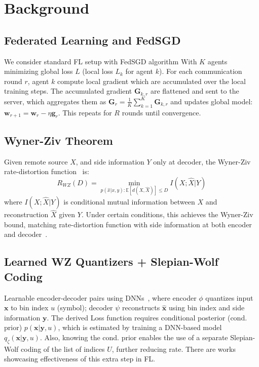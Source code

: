\section{Background}
\label{sec:background}

\subsection{Federated Learning and FedSGD}
\label{ssec:backFL}
We consider standard FL setup with FedSGD algorithm With $K$ agents minimizing global loss $L$ (local loss $L_k$ for agent $k$). For each communication round $r$, agent $k$ compute local gradient which are accumulated over the local training steps. The accumulated gradient $\mathbf{G}_{k,r}$  are flattened and sent to the server, which aggregates them as $\mathbf{G}_r = \frac{1}{K} \sum_{k=1}^{K} \mathbf{G}_{k,r}$ and updates global model: $\mathbf{w}_{r+1} = \mathbf{w}_r - \eta \mathbf{g}_r$. This repeats for $R$ rounds until convergence.

\subsection{Wyner-Ziv Theorem}
\label{ssec:backwz}
Given remote source $X$, and side information $Y$ only at decoder, the Wyner-Ziv rate-distortion function~\cite{WynerZiv1976} is:
\begin{equation}
    R_{WZ}(D) = \min_{p(\hat{x}|x,y): \mathbb{E}[d(X,\hat{X})] \leq D} I(X;\hat{X}|Y)
\end{equation}
where $I(X;\hat{X}|Y)$ is conditional mutual information between $X$ and reconstruction $\hat{X}$ given $Y$. Under certain conditions, this achieves the Wyner-Ziv bound, matching rate-distortion function with side information at both encoder and decoder~\cite{WynerZiv1976}.

\subsection{Learned WZ Quantizers + Slepian-Wolf Coding}
\label{ssec:backlwzq}
Learnable encoder-decoder pairs using DNNs~\cite{OzywzRecoverBinning}, where encoder $\phi$ quantizes input $\mathbf{x}$ to bin index $u$ (symbol); decoder $\psi$ reconstructs $\hat{\mathbf{x}}$ using bin index and side information $\mathbf{y}$.
The derived Loss function requires conditional posterior (cond. prior) $p(\mathbf{x}|\mathbf{y},u)$, which is estimated by training a DNN-based model $q_\zeta(\mathbf{x}|\mathbf{y},u)$. Also, knowing the cond. prior enables the use of a separate Slepian-Wolf coding of the list of indices $U$, further reducing rate. There are works~\cite{ZhangTao2022} showcasing effectiveness of this extra step in FL.

